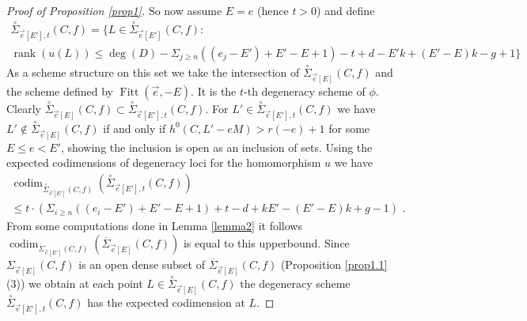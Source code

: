 \documentclass{article}
\DeclareMathOperator{\rk}{rank}
\DeclareMathOperator{\codim}{codim}
\DeclareMathOperator{\Fitt}{Fitt}
\theoremstyle{definition}
\theoremstyle{remark}
\begin{document}
\begin{proof}[Proof of Proposition \ref{prop1}]
So now assume $E=e$ (hence $t>0$) and define
\begin{multline*}
\overset {\circ}{\Sigma}_{\overrightarrow {e}[E'],t}(C,f) = \{ L \in \overset {\circ}{\Sigma}_{\overrightarrow {e}[E']}(C,f) : \\
\rk (u(L)) \leq \deg (D)-\Sigma _{j\geq n} ((e_j-E')+E'-E+1)-t+d-E'k+(E'-E)k-g+1 \}
\end{multline*}
As a scheme structure on this set we take the intersection of $\overset{\circ}{\Sigma}_{\overrightarrow {e}[E]}(C,f)$ and the scheme defined by $\Fitt(\overrightarrow {e},-E)$.
It is the $t$-th degeneracy scheme of $\phi$.
Clearly $\overset {\circ}{\Sigma} _{\overrightarrow {e}[E]}(C,f) \subset \overset {\circ}{\Sigma} _{\overrightarrow {e}[E'],t}(C,f)$.
For $L' \in \overset {\circ}{\Sigma} _{\overrightarrow {e}[E'],t}(C,f)$ we have $L' \notin \overset {\circ}{\Sigma}_{\overrightarrow {e}[E]}(C,f)$ if and only if $h^0(C,L'-eM) > r(-e)+1$ for some $E \leq e <E'$, showing the inclusion is open as an inclusion of sets.
Using the expected codimensions of degeneracy loci for the homomorphism $u$ we have
\begin{multline*}
\codim _{\overset {\circ}{\Sigma}_{\overrightarrow {e}[E']}(C,f)}(\overset {\circ}{\Sigma}_{\overrightarrow {e}[E'],t}(C,f)) \\
\leq t \cdot (\Sigma _{i \geq n}((e_i-E')+E'-E+1)+t-d+kE'-(E'-E)k+g-1) \text { .} 
\end{multline*}
From some computations done in Lemma \ref{lemma2} it follows $\codim _{\overline{\Sigma}_{\overrightarrow {e}[E']}(C,f)}(\overline {\Sigma}_{\overrightarrow {e}[E]}(C,f))$ is equal to this upperbound.
Since $\Sigma _{\overrightarrow {e}[E]}(C,f)$ is an open dense subset of $\overline {\Sigma}_{\overrightarrow {e}[E]}(C,f)$ (Proposition \ref{prop1.1} (3)) we obtain at each point $L \in \overset{\circ}{\Sigma}_{\overrightarrow {e}[E]}(C,f)$ the degeneracy scheme $\overset {\circ}{\Sigma}_{\overrightarrow {e}[E'],t}(C,f)$ has the expected codimension at $L$.



\end{proof}
\end{document}
